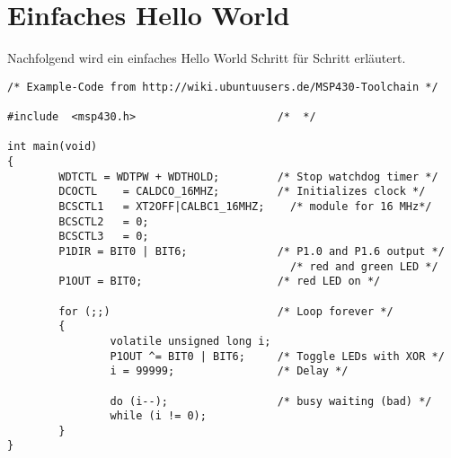 



\section{Einfaches Hello World}
Nachfolgend wird ein einfaches Hello World Schritt für Schritt erläutert. 
\begin{lstlisting}
/* Example-Code from http://wiki.ubuntuusers.de/MSP430-Toolchain */

#include  <msp430.h>                      /*  */  

int main(void)
{
        WDTCTL = WDTPW + WDTHOLD;         /* Stop watchdog timer */
        DCOCTL    = CALDCO_16MHZ;         /* Initializes clock */
        BCSCTL1   = XT2OFF|CALBC1_16MHZ;    /* module for 16 MHz*/
        BCSCTL2   = 0;           
        BCSCTL3   = 0;           
        P1DIR = BIT0 | BIT6;              /* P1.0 and P1.6 output */
                                            /* red and green LED */
        P1OUT = BIT0;                     /* red LED on */

        for (;;)                          /* Loop forever */
        {
                volatile unsigned long i;
                P1OUT ^= BIT0 | BIT6;     /* Toggle LEDs with XOR */
                i = 99999;                /* Delay */

                do (i--);                 /* busy waiting (bad) */
                while (i != 0);
        }
}

\end{lstlisting}